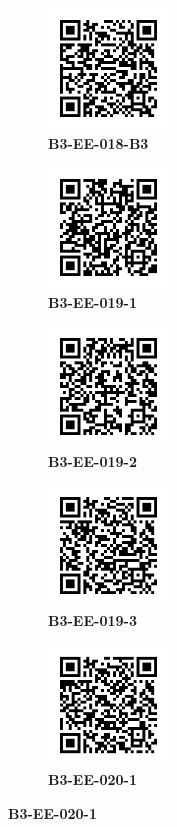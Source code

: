 \documentclass{article}
\begin{document}
	\begin{figure}[]
		\centering
		\begin{subfigure}{0.19\textwidth}
			\centering
			\includegraphics[width = 3.2cm,height = 3.2cm]{B3-EE-018-B3}
			\caption*{\large{\textbf{B3-EE-018-B3}}}
		\end{subfigure}\hfil
		\begin{subfigure}{0.19\textwidth}
			\centering
			\includegraphics[width = 3.2cm,height = 3.2cm]{B3-EE-019-1}
			\caption*{\large{\textbf{B3-EE-019-1}}}
		\end{subfigure}\hfil
		\begin{subfigure}{0.19\textwidth}
			\centering
			\includegraphics[width = 3.2cm,height = 3.2cm]{B3-EE-019-2}
			\caption*{\large{\textbf{B3-EE-019-2}}}
		\end{subfigure}\hfil
		\begin{subfigure}{0.19\textwidth}
			\centering
			\includegraphics[width = 3.2cm,height = 3.2cm]{B3-EE-019-3}
			\caption*{\large{\textbf{B3-EE-019-3}}}
		\end{subfigure}\hfil
		\begin{subfigure}{0.19\textwidth}
			\centering
			\includegraphics[width = 3.2cm,height = 3.2cm]{B3-EE-020-1}
			\caption*{\large{\textbf{B3-EE-020-1}}}
		\end{subfigure}\hfil
	\end{figure}
\end{document}
